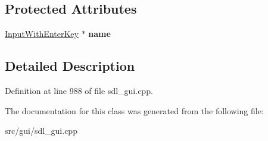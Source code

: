 \subsection*{Protected Attributes}
\begin{DoxyCompactItemize}
\item 
\hypertarget{classSetCycles_ad75bca3a041f5aa2d66ede78b1f563c9}{\hyperlink{classInputWithEnterKey}{Input\-With\-Enter\-Key} $\ast$ {\bfseries name}}\label{classSetCycles_ad75bca3a041f5aa2d66ede78b1f563c9}

\end{DoxyCompactItemize}


\subsection{Detailed Description}


Definition at line 988 of file sdl\-\_\-gui.\-cpp.



The documentation for this class was generated from the following file\-:\begin{DoxyCompactItemize}
\item 
src/gui/sdl\-\_\-gui.\-cpp\end{DoxyCompactItemize}
